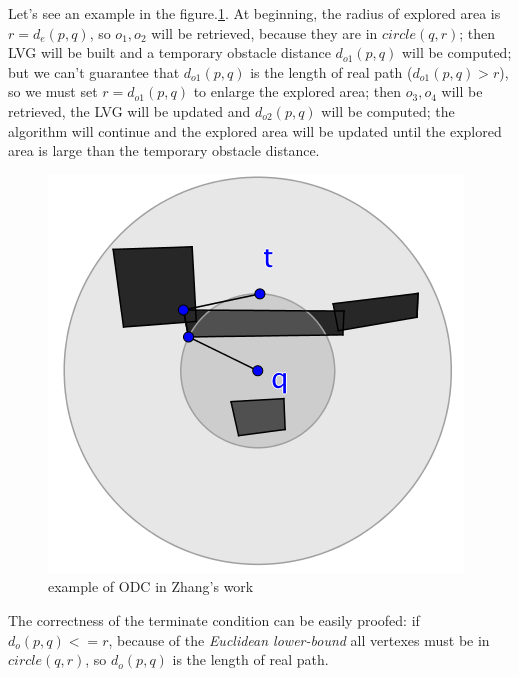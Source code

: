 Let's see an example in the figure.\ref{edbt_odc}. At beginning, the radius of explored area is
$r=d_e(p, q)$, so $o_1,o_2$ will be retrieved, because they are in $circle(q, r)$; then LVG
will be built and a temporary obstacle distance $d_{o1}(p, q)$ will be computed; but we can't
guarantee that $d_{o1}(p, q)$ is the length of real path ($d_{o1}(p, q) > r$), so we
must set $r=d_{o1}(p, q)$ to enlarge the explored area; then $o_3, o_4$ will be retrieved, the
LVG will be updated and $d_{o2}(p, q)$ will be computed; the algorithm will continue and the
explored area will be updated until the explored area is large than the temporary obstacle
distance.

\begin{figure}[htp]
  \centering
  \includegraphics[width=.5\linewidth]{pic/edbt_odc.png}
  \caption{example of ODC in Zhang's work}
  \label{edbt_odc}
\end{figure}


The correctness of the terminate condition can be easily proofed:  if $d_o(p, q) <= r$, because of
the \textit{Euclidean lower-bound} all vertexes must be in $circle(q, r)$, so $d_o(p, q)$ is the length of real path.

